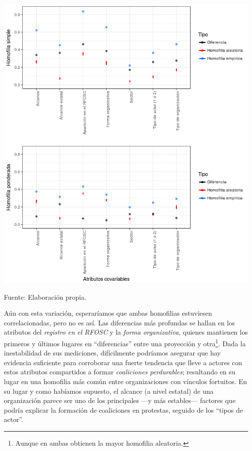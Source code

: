 \documentclass[letterpaper, 11pt]{book}
\theoremstyle{definition}
\theoremstyle{remark}
\begin{document}
\begin{minipage}{\linewidth}
\centering
{} \label{5.12_homofiliaAttr}
\includegraphics[scale=0.7]{img/5.12_homofiliaAttr.png}
\par\bigskip
\small Fuente: Elaboración propia. 
\end{minipage}\bigskip


Aún con esta variación, esperaríamos que ambas homofilias estuviesen correlacionadas, pero no es así. 
Las diferencias más profundas se hallan en los atributos del \emph{registro en el RFOSC} y la \emph{forma organizativa}, quienes mantienen los primeros y últimos lugares en ``diferencias'' entre una proyección y otra\footnote{
    Aunque en ambas obtienen la mayor homofilia aleatoria. 
}. 
Dada la inestabilidad de sus mediciones, difícilmente podríamos asegurar que hay evidencia suficiente para corroborar una fuerte tendencia que lleve a actores con estos atributos compartidos a formar \emph{coaliciones perdurables}; resultando en su lugar en una homofilia más común entre organizaciones con vínculos fortuitos. 
En su lugar y como habíamos supuesto, el alcance (a nivel estatal) de una organización parece ser uno de los principales ---y más estables--- factores que podría explicar la formación de coaliciones en protestas, seguido de los ``tipos de actor''. 
\end{document}
